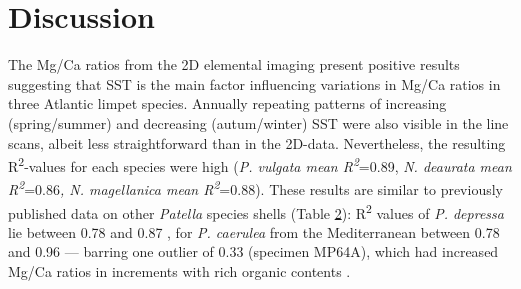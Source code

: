 \documentclass[
  authoryear,
  preprint,
  3p]{elsarticle}
\begin{document}
\section{Discussion}\label{Discussion}

The Mg/Ca ratios from the 2D elemental imaging present positive results
suggesting that SST is the main factor influencing variations in Mg/Ca
ratios in three Atlantic limpet species. Annually repeating patterns of
increasing (spring/summer) and decreasing (autum/winter) SST were also
visible in the line scans, albeit less straightforward than in the
2D-data. Nevertheless, the resulting R\textsuperscript{2}-values for
each species were high (\emph{P. vulgata mean
R\textsuperscript{2}}=0.89, \emph{N. deaurata mean
R\textsuperscript{2}}=0.86\emph{, N. magellanica mean
R\textsuperscript{2}}=0.88). These results are similar to previously
published data on other \emph{Patella} species shells (Table
\hyperref[Table_2]{2}): R\textsuperscript{2} values of \emph{P.
depressa} lie between 0.78 and 0.87 \citep{Garcia-Escarzaga2021-ij}, for
\emph{P. caerulea} from the Mediterranean between 0.78 and 0.96 ---
barring one outlier of 0.33 (specimen MP64A), which had increased Mg/Ca
ratios in increments with rich organic contents \citep{Hausmann2019-fi}.

\label{Table_2}
\fontsize{8pt}{8pt}\selectfont
\end{document}

